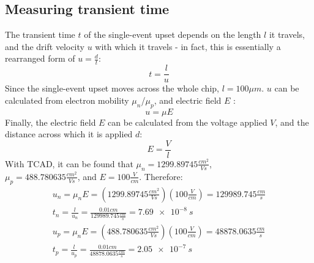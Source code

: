 \documentclass[12pt]{article}
\begin{document}
  \subsection{Measuring transient time}
  The transient time $t$ of the single-event upset depends on the length $l$ it travels, and the drift velocity $u$ with which it travels - in fact, this is essentially a rearranged form of $u=\frac{d}{t}$:
  \begin{equation}
    t=\frac{l}{u}
  \end{equation}
  Since the single-event upset moves across the whole chip, $l=100{\mu}m$. $u$ can be calculated from electron mobility $\mu_n$/$\mu_p$, and electric field $E$ \citep{wikipedia_drift}:
  \begin{equation}
    u={\mu}E
  \end{equation}
  Finally, the electric field $E$ can be calculated from the voltage applied $V$, and the distance across which it is applied $d$:
  \begin{equation}
    E=\frac{V}{l}
  \end{equation}
  With TCAD, it can be found that $\mu_n=1299.89745\frac{cm^2}{Vs}$, \\$\mu_p=488.780635\frac{cm^2}{Vs}$, and $E=100\frac{V}{cm}$. Therefore:
\begin{equation}
  \begin{gathered}
    u_n=\mu_nE=(1299.89745\frac{cm^2}{Vs})(100\frac{V}{cm})=129989.745\frac{cm}{s}\\
    t_n=\frac{l}{u_n}=\frac{0.01cm}{129989.745\frac{cm}{s}}=\SI{7.69e-8}{s}\\
    u_p=\mu_nE=(488.780635\frac{cm^2}{Vs})(100\frac{V}{cm})=48878.0635\frac{cm}{s}\\
    t_p=\frac{l}{u_p}=\frac{0.01cm}{48878.0635\frac{cm}{s}}=\SI{2.05e-7}{s}\\
  \end{gathered}
\end{equation}



\end{document}
